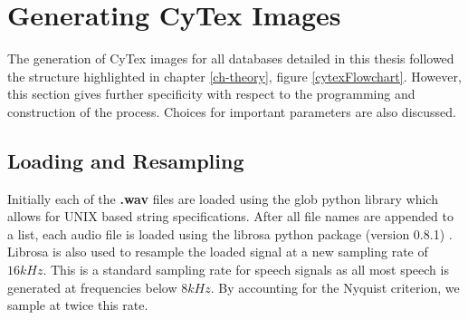 \section{Generating CyTex Images}
The generation of CyTex images for all databases detailed in this thesis followed the structure highlighted in chapter \ref{ch-theory}, figure \ref{cytexFlowchart}. However, this section gives further specificity with respect to the programming and construction of the process. Choices for important parameters are also discussed.
\subsection{Loading and Resampling}
Initially each of the \textbf{.wav} files are loaded using the glob python library which allows for UNIX based string specifications. After all file names are appended to a list, each audio file is loaded using the librosa python package (version 0.8.1) \cite{brian_mcfee_2021_4782663}. Librosa is also used to resample the loaded signal at a new sampling rate of $16kHz$. This is a standard sampling rate for speech signals as all most speech is generated at frequencies below $8kHz$. By accounting for the Nyquist criterion, we sample at twice this rate.\\ \\
